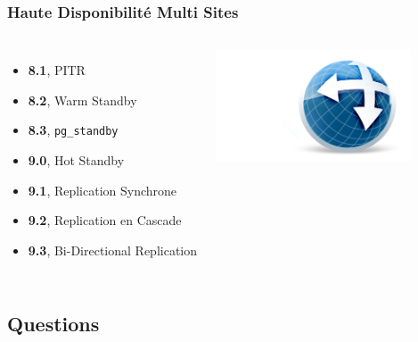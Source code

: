\documentclass[english]{beamer}
\begin{document}
\begin{frame}[fragile]
  \frametitle{Haute Disponibilité Multi Sites}

  \linebreak

\begin{columns}[c]

  \begin{itemize}
   \item<1-> \textbf{8.1}, PITR
   \item<2-> \textbf{8.2}, Warm Standby
   \item<3-> \textbf{8.3}, \texttt{pg\_standby}
   \item<4-> \textbf{9.0}, Hot Standby
   \item<5-> \textbf{9.1}, Replication Synchrone
   \item<6-> \textbf{9.2}, Replication en Cascade
   \item<7-> \textbf{9.3}, \alert{Bi-Directional Replication}
  \end{itemize}  

\includegraphics[height=9em]{bdr.png}
\end{columns}
\end{frame}

\subsection{Questions}

\end{document}
